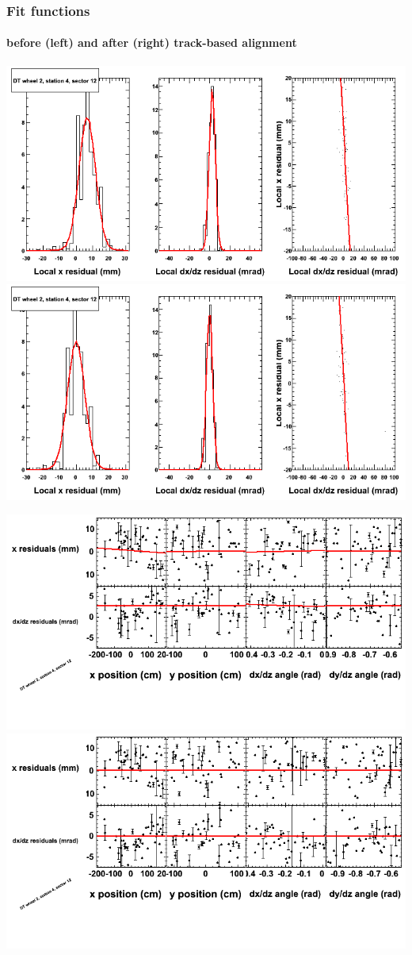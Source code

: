 \documentclass[compress]{beamer}
\begin{document}
\begin{frame}
\frametitle{Fit functions}
\framesubtitle{before (left) and after (right) track-based alignment}
\includegraphics[width=0.5\linewidth]{fitfunctions_re01/MBwhEst4sec12_bellcurves.png} \includegraphics[width=0.5\linewidth]{fitfunctions_re05/MBwhEst4sec12_bellcurves.png}

\includegraphics[width=0.5\linewidth]{fitfunctions_re01/MBwhEst4sec12_polynomials.png} \includegraphics[width=0.5\linewidth]{fitfunctions_re05/MBwhEst4sec12_polynomials.png}
\end{frame}
\end{document}

